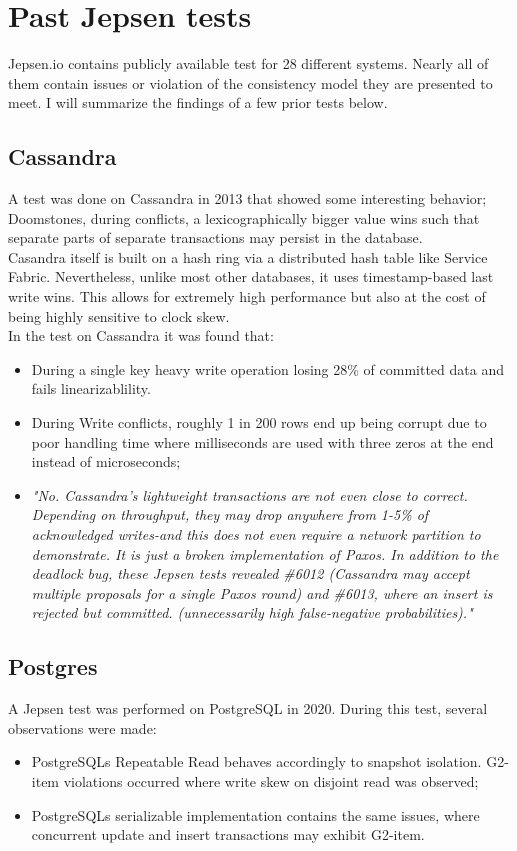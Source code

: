 \documentclass[a4paper,10pt,titlepage]{report}
\begin{document}
\section{Past Jepsen tests}
Jepsen.io contains publicly available test for 28 different systems. Nearly all of them contain issues or violation of the consistency model they are presented to meet. I will summarize the findings of a few prior tests below.
\subsection{Cassandra}
A test was done on Cassandra \cite{jepsencassandra} in 2013 that showed some interesting behavior; Doomstones, during conflicts, a lexicographically bigger value wins such that separate parts of separate transactions may persist in the database.\\
\vspace{5mm}
Casandra itself is built on a hash ring via a distributed hash table like Service Fabric. Nevertheless, unlike most other databases, it uses timestamp-based last write wins. This allows for extremely high performance but also at the cost of being highly sensitive to clock skew.\\

In the test on Cassandra it was found that:
\begin{itemize}
    \item During a single key heavy write operation losing 28\% of committed data and fails linearizablility.
    \item During Write conflicts, roughly 1 in 200 rows end up being corrupt due to poor handling time where milliseconds are used with three zeros at the end instead of microseconds;
    \item \textit{"No. Cassandra's lightweight transactions are not even close to correct. Depending on throughput, they may drop anywhere from 1-5\% of acknowledged writes-and this does not even require a network partition to demonstrate. It is just a broken implementation of Paxos. In addition to the deadlock bug, these Jepsen tests revealed \#6012 (Cassandra may accept multiple proposals for a single Paxos round) and \#6013, where an insert is rejected but committed. (unnecessarily high false-negative probabilities)."} \cite{jepsencassandra}
\end{itemize}

\subsection{Postgres}
A Jepsen test \cite{jepsenpostgresql} was performed on PostgreSQL in 2020. During this test, several observations were made:
\begin{itemize}
    \item PostgreSQLs Repeatable Read behaves accordingly to snapshot isolation. G2-item violations occurred where write skew on disjoint read was observed;
    \item PostgreSQLs serializable implementation contains the same issues, where concurrent update and insert transactions may exhibit G2-item.
\end{itemize}
\end{document}
